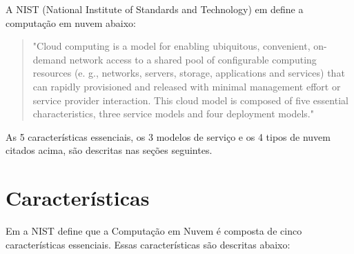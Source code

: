 	A NIST (National Institute of Standards and Technology) em \cite{NIST:2011} define a computação em nuvem abaixo:
	
	\begin{quotation}
		"Cloud computing is a model for enabling ubiquitous, convenient, on-demand network access to a shared pool of configurable computing resources (e. g., networks, servers, storage, applications and services) that can rapidly provisioned and released with minimal management effort or service provider interaction. This cloud model is composed of five essential characteristics, three service models and four deployment models."
	\end{quotation}	
	
	As 5 características essenciais, os 3 modelos de serviço e os 4 tipos de nuvem citados acima, são descritas nas seções seguintes.		

\section{Características} \label{cloud:char}
	Em \cite{NIST:2011} a NIST define que a Computação em Nuvem é composta de cinco características essenciais. Essas características são descritas abaixo:   

